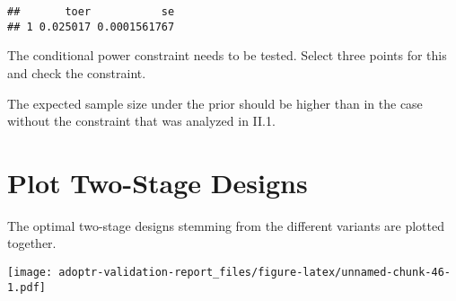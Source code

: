 \documentclass[]{book}
\newenvironment{Shaded}{\begin{snugshade}}{\end{snugshade}}
\newcommand{\ControlFlowTok}[1]{\textcolor[rgb]{0.13,0.29,0.53}{\textbf{#1}}}
\newcommand{\DecValTok}[1]{\textcolor[rgb]{0.00,0.00,0.81}{#1}}
\newcommand{\FloatTok}[1]{\textcolor[rgb]{0.00,0.00,0.81}{#1}}
\newcommand{\KeywordTok}[1]{\textcolor[rgb]{0.13,0.29,0.53}{\textbf{#1}}}
\newcommand{\NormalTok}[1]{#1}
\newcommand{\OperatorTok}[1]{\textcolor[rgb]{0.81,0.36,0.00}{\textbf{#1}}}
\newcommand{\StringTok}[1]{\textcolor[rgb]{0.31,0.60,0.02}{#1}}
\begin{document}
\begin{verbatim}
##       toer           se
## 1 0.025017 0.0001561767
\end{verbatim}

The conditional power constraint needs to be tested.
Select three points for this and check the constraint.

\begin{Shaded}
\end{Shaded}

The expected sample size under the prior should be higher than
in the case without the constraint that was analyzed in II.1.

\begin{Shaded}
\end{Shaded}

\hypertarget{plot-two-stage-designs-1}{%
\section{Plot Two-Stage Designs}\label{plot-two-stage-designs-1}}

The optimal two-stage designs stemming from the different variants
are plotted together.

\texttt{[image: adoptr-validation-report\_files/figure-latex/unnamed-chunk-46-1.pdf]}
\end{document}
